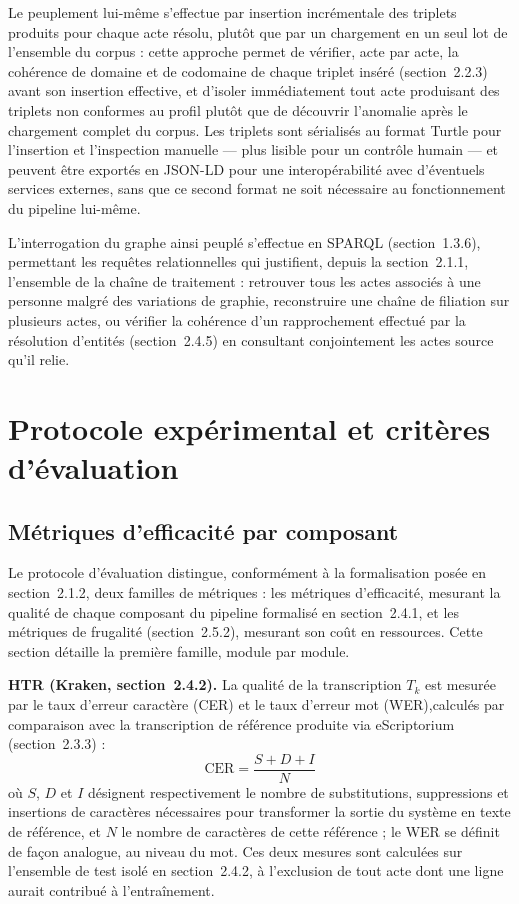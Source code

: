 Le peuplement lui-même s'effectue par insertion incrémentale des triplets produits pour chaque acte résolu, plutôt que par un chargement en un seul lot de l'ensemble du corpus : cette approche permet de vérifier, acte par acte, la cohérence de domaine et de codomaine de chaque triplet inséré (section~2.2.3) avant son insertion effective, et d'isoler immédiatement tout acte produisant des triplets non conformes au profil plutôt que de découvrir l'anomalie après le chargement complet du corpus.
Les triplets sont sérialisés au format Turtle pour l'insertion et l'inspection manuelle --- plus lisible pour un contrôle humain --- et peuvent être exportés en JSON-LD pour une interopérabilité avec d'éventuels services externes, sans que ce second format ne soit nécessaire au fonctionnement du pipeline lui-même.

L'interrogation du graphe ainsi peuplé s'effectue en SPARQL (section~1.3.6), permettant les requêtes relationnelles qui justifient, depuis la section~2.1.1, l'ensemble de la chaîne de traitement : retrouver tous les actes associés à une personne malgré des variations de graphie, reconstruire une chaîne de filiation sur plusieurs actes, ou vérifier la cohérence d'un rapprochement effectué par la résolution d'entités (section~2.4.5) en consultant conjointement les actes source qu'il relie.

\section{Protocole expérimental et critères d'évaluation}

\subsection{Métriques d'efficacité par composant}

Le protocole d'évaluation distingue, conformément à la formalisation posée en section~2.1.2, deux familles de métriques : les métriques d'efficacité, mesurant la qualité de chaque composant du pipeline formalisé en section~2.4.1, et les métriques de frugalité (section~2.5.2), mesurant son coût en ressources. Cette section détaille la première famille, module par module.

\textbf{HTR (Kraken, section~2.4.2).} La qualité de la transcription $T_k$ est mesurée par le taux d'erreur caractère (CER) et le taux d'erreur mot (WER),calculés par comparaison avec la transcription de référence produite via eScriptorium (section~2.3.3) :
\begin{equation}
    \mathrm{CER} = \frac{S+D+I}{N}
\end{equation}
où $S$, $D$ et $I$ désignent respectivement le nombre de substitutions, suppressions et insertions de caractères nécessaires pour transformer la sortie du système en texte de référence, et $N$ le nombre de caractères de cette référence ; le WER se définit de façon analogue, au niveau du mot.
Ces deux mesures sont calculées sur l'ensemble de test isolé en section~2.4.2, à l'exclusion de tout acte dont une ligne aurait contribué à l'entraînement.

